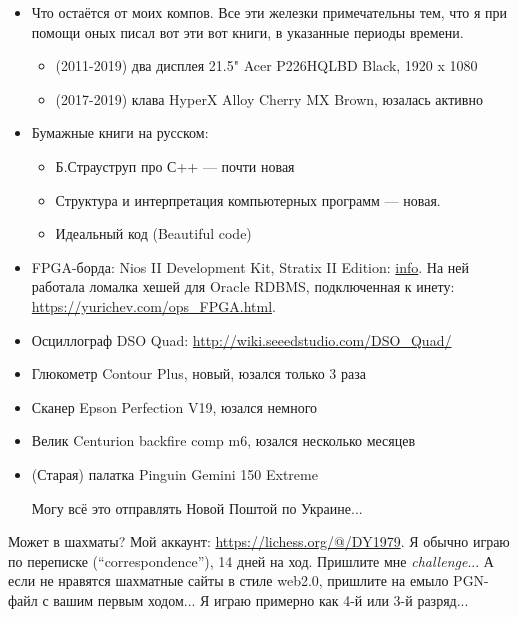 \begin{itemize}
\item Что остаётся от моих компов. Все эти железки примечательны тем, что я при помощи оных писал вот эти вот книги, в указанные периоды времени.
	\begin{itemize}
	\item (2011-2019) два дисплея 21.5" Acer P226HQLBD Black, 1920 x 1080 
	\item (2017-2019) клава HyperX Alloy Cherry MX Brown, юзалась активно
	\end{itemize}

\item Бумажные книги на русском:
	\begin{itemize}
	\item Б.Страуструп про С++ --- почти новая
	\item Структура и интерпретация компьютерных программ --- новая.
	\item Идеальный код (Beautiful code)
	\end{itemize}

\item FPGA-борда: Nios II Development Kit, Stratix II Edition: \href{https://www.intel.com/content/www/us/en/programmable/products/boards_and_kits/dev-kits/altera/kit-niosii-2s60.html}{info}.
На ней работала ломалка хешей для Oracle RDBMS, подключенная к инету: \url{https://yurichev.com/ops_FPGA.html}.
\item Осциллограф DSO Quad: \url{http://wiki.seeedstudio.com/DSO_Quad/}
\item Глюкометр Contour Plus, новый, юзался только 3 раза
\item Сканер Epson Perfection V19, юзался немного
\item Велик Centurion backfire comp m6, юзался несколько месяцев

\item (Старая) палатка Pinguin Gemini 150 Extreme

Могу всё это отправлять Новой Поштой по Украине...

\end{itemize}

\myhrule{}

Может в шахматы?
Мой аккаунт: \url{https://lichess.org/@/DY1979}.
Я обычно играю по переписке (``correspondence''), 14 дней на ход.
Пришлите мне \textit{challenge}...
А если не нравятся шахматные сайты в стиле web2.0, пришлите на емыло PGN-файл с вашим первым ходом...
Я играю примерно как 4-й или 3-й разряд...

